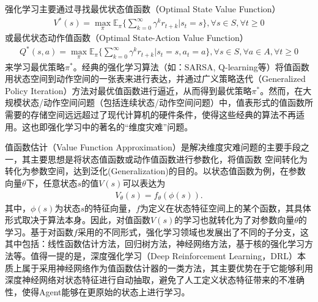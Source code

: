 强化学习主要通过寻找最优状态值函数（Optimal State Value Function）\begin{align}
 V^*(s) = \max_{\pi} \mathbb{E}_{\pi} \{ \sum_{k=0}^{\infty} \gamma^k r_{t+k} | s_t = s \}, \forall s \in S, \forall t \geq 0 
\end{align}
 或最优状态动作值函数（Optimal State-Action Value Function）\begin{align}
 Q^*(s,a) = \max_{\pi} \mathbb{E}_{\pi} \{ \sum_{k=0}^{\infty} \gamma^k r_{t+k} | s_t = s, a_t = a \}, \forall s \in S, \forall a \in A, \forall t \geq 0 
\end{align}
 来学习最优策略${\pi}^*$。经典的强化学习算法（如：SARSA, Q-learning等）将值函数用状态空间到动作空间的一张表来进行表达，并通过广义策略迭代（Generalized Policy Iteration）方法对最优值函数进行逼近，从而得到最优策略${\pi}^*$。然而，在大规模状态/动作空间问题（包括连续状态/动作空间问题）中，值表形式的值函数所需要的存储空间远远超过了现代计算机的硬件条件，使得这些经典的算法不再适用。这也即强化学习中的著名的“维度灾难”问题。

值函数估计（Value Function Approximation）是解决维度灾难问题的主要手段之一，其主要思想是将状态值函数或动作值函数进行参数化，将值函数 空间转化为转化为参数空间，达到泛化(Generalization)的目的。以状态值函数为例，在参数向量$\theta$下，任意状态$s$的值$V(s)$可以表达为
\begin{align}
 V_{\theta}(s) = f_{\theta}(\phi(s)). 
\end{align}
 其中，$\phi(s)$为状态$s$的特征向量，$f$为定义在状态特征空间上的某个函数，其具体形式取决于算法本身。因此，对值函数$V(s)$的学习也就转化为了对参数向量$\theta$的学习。基于对函数$f$采用的不同形式，强化学习领域也发展出了不同的子分支，这其中包括：线性函数估计方法，回归树方法，神经网络方法，基于核的强化学习方法等。值得一提的是，深度强化学习（Deep Reinforcement Learning，DRL）本质上属于采用神经网络作为值函数估计器的一类方法，其主要优势在于它能够利用深度神经网络对状态特征进行自动抽取，避免了人工定义状态特征带来的不准确性，使得Agent能够在更原始的状态上进行学习。

